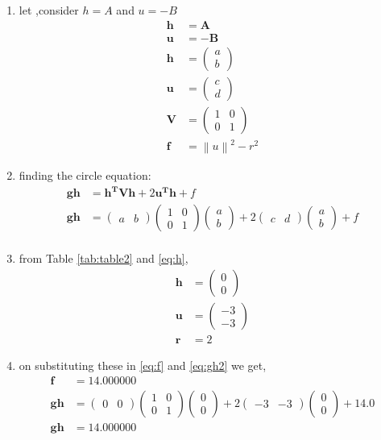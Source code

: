 \documentclass[11pt, a4paper]{article}
\newcommand{\myvec}[1]{\ensuremath{\begin{pmatrix}#1\end{pmatrix}}}
\let\vec\mathbf
\providecommand{\norm}[1]{\left\lVert#1\right\rVert}
\begin{document}
\begin{enumerate}
\begin{enumerate}

\item let ,consider $h = A$ and $u=-B$
\begin{align}
	\vec{h} &=\vec{A} \label{eq:h} \\
	\vec{u} &=\vec{-B} \\
	\vec{h} &=\myvec{a \\ b} \\
\vec{u} &= \myvec{c \\ d}  \\
	\vec{V} &= \myvec{1 & 0 \\ 0 & 1} \\
	\vec{f} &= \norm{u}^2-r^2   \label{eq:f}
\end{align}

\item finding the circle equation: 
\begin{align}
	\vec{gh} &= \vec{h^T}\vec{V}\vec{h} + 2\vec{u^T}\vec{h} + f    \label{eq:gh}\\
	\vec{gh} &= \myvec{a &b}\myvec{1 & 0 \\ 0 & 1}\myvec{a \\ b} + 2\myvec{c& d}\myvec{a \\b } + f   \label{eq:gh2} \\
\end{align}

\item from Table \ref{tab:table2} and \eqref{eq:h}, 
\begin{align}
\vec{h} &=\myvec{0 \\ 0} \\
\vec{u} &= \myvec{-3 \\ -3} \\
\vec{r} &= 2 
\end{align}
\item on substituting these in \eqref{eq:f} and  \eqref{eq:gh2} we get,
\begin{align}
\vec{f} &=14.000000 \\
\vec{gh} &= \myvec{0 &0 }\myvec{1 & 0 \\ 0 & 1}\myvec{0 \\ 0} + 2\myvec{-3& -3}\myvec{0 \\0 } + 14.0 \\
\vec{gh} &= 14.000000  
\end{align}


\end{enumerate}
\end{enumerate}
\end{document}
